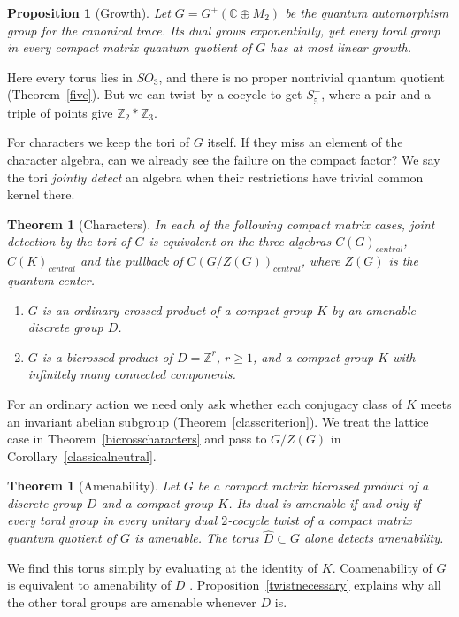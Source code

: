\documentclass[11pt,a4paper]{article}
\newtheorem{introprop}[oldconj]{Proposition}
\newtheorem{introthm}[oldconj]{Theorem}
\theoremstyle{remark}
\begin{document}
\begin{introprop}[Growth]\label{countergrowth}
Let $G=G^+(\mathbb C\oplus M_2)$ be the quantum automorphism group
for the canonical trace. Its dual grows exponentially, yet every toral group in every
compact matrix quantum quotient of $G$ has at most linear growth.
\end{introprop}

Here every torus lies in $SO_3$, and there is no proper nontrivial
quantum quotient (Theorem~\ref{five}). But we can twist by a cocycle
to get $S_5^+$, where a pair and a triple of points give
$\mathbb Z_2*\mathbb Z_3$.

For characters we keep the tori of $G$ itself. If they miss an element
of the character algebra, can we already see the failure on the compact
factor? We say the tori \emph{jointly detect} an algebra when their
restrictions have trivial common kernel there.

\begin{introthm}[Characters]\label{introchar}
In each of the following compact matrix cases, joint detection by the
tori of $G$ is equivalent on the three algebras $C(G)_{central}$, $C(K)_{central}$
and the pullback of $C(G/Z(G))_{central}$, where $Z(G)$ is the quantum center.
\begin{enumerate}
\item $G$ is an ordinary crossed product of a compact group $K$ by an
amenable discrete group $D$.
\item $G$ is a bicrossed product of $D=\mathbb Z^r$, $r\ge1$, and a
compact group $K$ with infinitely many connected components.
\end{enumerate}
\end{introthm}

For an ordinary action we need only ask whether each conjugacy class
of $K$ meets an invariant abelian subgroup (Theorem~\ref{classcriterion}).
We treat the lattice case in Theorem~\ref{bicrosscharacters} and pass to
$G/Z(G)$ in Corollary~\ref{classicalneutral}.

\begin{introthm}[Amenability]\label{introamen}
Let $G$ be a compact matrix bicrossed product of a discrete group $D$
and a compact group $K$. Its dual is amenable if and only if every
toral group in every unitary dual $2$-cocycle twist of a compact matrix
quantum quotient of $G$ is amenable. The torus $\widehat D\subset G$
alone detects amenability.
\end{introthm}

We find this torus simply by evaluating at the identity of $K$.
Coamenability of $G$ is equivalent to amenability of $D$
\cite[Corollary~3.7]{fmp}. Proposition~\ref{twistnecessary} explains why
all the other toral groups are amenable whenever $D$ is.
\end{document}
